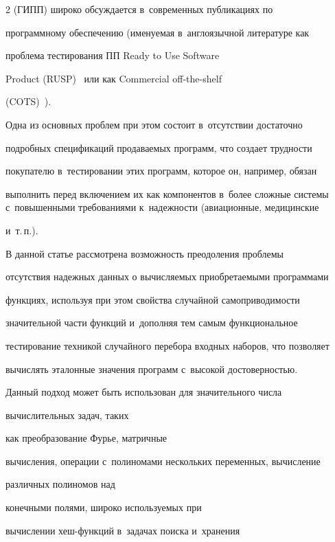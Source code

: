 \begin{multicols}{2}
     (ГИПП) широко обсуждается в~современных публикациях по 


программному обеспечению (именуемая в~англоязычной литературе как 


проблема тестирования ПП Ready to Use Software 


Product (RUSP)~\cite{7-bf} или как Commercial off-the-shelf  


(COTS)~\cite{18-bf}).


    


    Одна из основных проблем при этом состоит в~отсутствии достаточно 


подробных спецификаций продаваемых программ, что создает трудности 


покупателю в~тестировании этих программ, которое он, например, обязан 


выполнить перед включением их как компонентов в~более сложные системы с~повышенными требованиями к~надежности (авиационные, медицинские 


и~т.\,п.).


    


    В данной статье рассмотрена возможность преодоления проблемы 


отсутствия надежных данных о вычисляемых приобретаемыми программами 


функциях, используя при этом свойства случайной самоприводимости 


значительной части функций и~дополняя тем самым функциональное 


тестирование техникой случайного перебора входных наборов, что позволяет 


вычислять эталонные значения программ с~высокой достоверностью.


    


    Данный подход может быть использован для значительного числа 


вычислительных задач, таких\linebreak


 как преобразование Фурье, матричные 


вы\-чис\-ления, операции с~полиномами нескольких пе\-ре\-менных, вычисление 


различных полиномов над\linebreak


 конечными полями, широко используемых при 


вычислении хеш-функ\-ций в~задачах поиска и~хранения  



\end{multicols}
